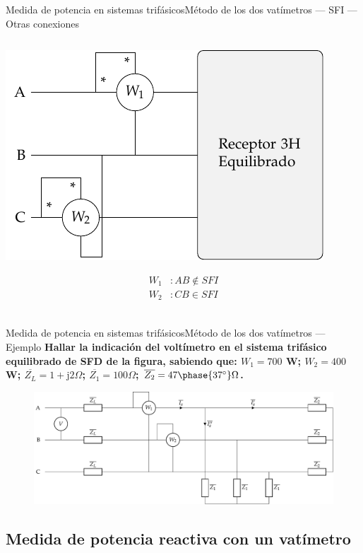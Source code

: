 \documentclass[aspectratio=169, xcolor={usenames,svgnames,dvipsnames}]{beamer}
\begin{document}
\begin{frame}{Medida de potencia en sistemas trifásicos}{Método de los dos vatímetros --- SFI --- Otras conexiones}
\begin{columns}
\begin{column}{0.33\columnwidth}
\begin{center}
\includegraphics[width=.8\linewidth]{../figs/Potencia3H_Equilibrado_CA_SFI.pdf}
\end{center}
\begin{align*}
  W_1&: AB \notin SFI\\
  W_2&: CB \in SFI\\
\end{align*}
\end{column}
\end{columns}
\end{frame}

\begin{frame}{Medida de potencia en sistemas trifásicos}{Método de los dos vatímetros --- Ejemplo}
    \textbf{Hallar la indicación del voltímetro en el sistema trifásico equilibrado de SFD de la figura, sabiendo que: $W_1=700$ W; $W_2=400$ W; $\overline{Z_L}=1+\mathrm{j}2\Omega$; $\overline{Z_1}=100\Omega$; $\overline{Z_2}=47\phase{37^\circ}\Omega$.}
\begin{figure}[H]
    \centering
    \includegraphics[width=0.8\linewidth]{../figs/ej_dosvat.pdf}
\end{figure}
\end{frame}

\subsection{Medida de potencia reactiva con un vatímetro}
\end{document}
